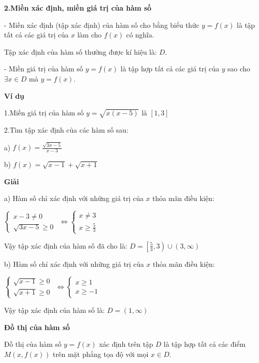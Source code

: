 \documentclass[12pt,oneside,a4paper,reqno]{book}
\begin{document}
{\bf 2.Miền xác định, miền giá trị của hàm số}

     - Miền xác định (tập xác định) của hàm số cho bằng biểu thức $y=f(x)$ là tập tất cả các giá trị của $x$ làm cho $f(x)$ có nghĩa.
     
Tập xác định của hàm số thường được kí hiệu là: $D$.

     - Miền giá trị của hàm số $y=f(x)$ là tập hợp tất cả các giá trị của $y$ sao cho $\exists x \in D$ mà $y=f(x).$
     
{\bf Ví dụ}

1.Miền giá trị của hàm số $y=\sqrt{x(x-5)}$ là $\left[1,3\right]$

2.Tìm tập xác định của các hàm số sau:

a) $f(x)=\frac{\sqrt{3x-5}}{x-3}$

b) $f(x)=\sqrt{x-1}+\sqrt{x+1}$

{\bf Giải}

a)	Hàm số chỉ xác định với những giá trị của $x$ thỏa mãn điều kiện:

$\left\{ \begin{array}{l}
 x-3 \neq 0\\
\sqrt{3x-5} \ge 0                           
\end{array} \right.$
$ \Longleftrightarrow \left\{ \begin{array}{l}
 x \neq 3\\
x \ge \frac{5}{3}                         
\end{array} \right.$

Vậy tập xác định của hàm số đã cho là: $D=\left[ {\frac{5}{3},3} \right) \cup \left( {3,  \infty } \right)$

b) Hàm số chỉ xác định với những giá trị của $x$ thỏa mãn điều kiện:

$\left\{ \begin{array}{l}
 \sqrt{x-1} \ge 0\\
\sqrt{x+1} \ge 0                           
\end{array} \right.$
$ \Longleftrightarrow \left\{ \begin{array}{l}
 x \ge 1\\
x \ge -1                         
\end{array} \right.$

Vậy tập xác định của hàm số là: $D=\left( {1,\infty } \right)$

{\bf Đồ thị của hàm số}

Đồ thị của hàm số $y=f(x)$ xác định trên tập $D$ là tập hợp tất cả các điểm $M(x,f(x))$ trên mặt phẳng tọa độ với mọi $x \in D$.
\end{document}

